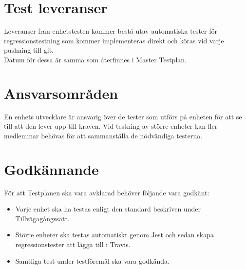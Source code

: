 \section{Test leveranser}

Leveranser från enhetstesten kommer bestå utav automatiska tester för regressionstestning som kommer implementeras direkt och köras vid varje pushning till git. 
\\
Datum för dessa är samma som återfinnes i Master Testplan.



\section{Ansvarsområden}
	En enhets utvecklare är ansvarig över de tester som utförs på enheten för att se till att den lever upp till kraven. Vid testning av större enheter kan fler medlemmar behövas för att sammanställa de nödvändiga testerna.
	
	
	
\section{Godkännande}
	För att Testplanen ska vara avklarad behöver följande vara godkänt:
	\begin{itemize}
	 \item Varje enhet ska ha testas enligt den standard beskriven under Tillvägagångssätt.
	 \item Större enheter ska testas automatiskt genom Jest och sedan skapa regressionstester att lägga till i Travis.
	 \item Samtliga test under testföremål ska vara godkända.
	\end{itemize}
	



\printbibliography


